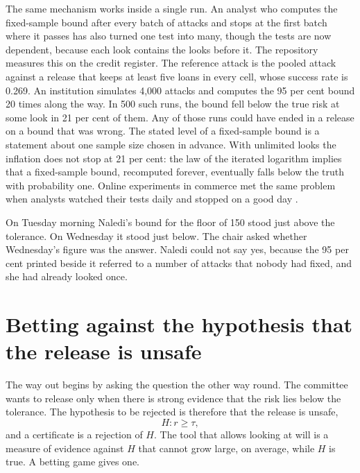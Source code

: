The same mechanism works inside a single run. An analyst who computes the
fixed-sample bound after every batch of attacks and stops at the first batch where
it passes has also turned one test into many, though the tests are now dependent,
because each look contains the looks before it. The repository measures this on the
credit register. The reference attack is the pooled attack against a release that
keeps at least five loans in every cell, whose success rate is 0.269.
An institution simulates 4,000 attacks and computes the 95 per cent bound 20 times
along the way. In 500 such runs, the bound fell below the true risk at some look in
21 per cent of them. Any of those runs could have ended in a release on a bound that
was wrong.
The stated level of a fixed-sample bound is a statement about one sample size
chosen in advance. With unlimited looks the inflation does not stop at 21 per cent:
the law of the iterated logarithm implies that a fixed-sample bound, recomputed
forever, eventually falls below the truth with probability one. Online experiments
in commerce met the same problem when analysts watched their tests daily and
stopped on a good day \citep{johari2022}.

On Tuesday morning Naledi's bound for the floor of 150 stood just above the
tolerance. On Wednesday it stood just below. The chair asked whether Wednesday's
figure was the answer. Naledi could not say yes, because the 95 per cent printed
beside it referred to a number of attacks that nobody had fixed, and she had
already looked once.

\syntheticnote


\section{Betting against the hypothesis that the release is unsafe}\label{c06:sec-martingale}

The way out begins by asking the question the other way round. The committee wants
to release only when there is strong evidence that the risk lies below the
tolerance. The hypothesis to be rejected is therefore that the release is unsafe,
\[
H : r \ge \tau ,
\]
and a certificate is a rejection of $H$. The tool that allows looking at will is a
measure of evidence against $H$ that cannot grow large, on average, while $H$ is
true. A betting game gives one.

